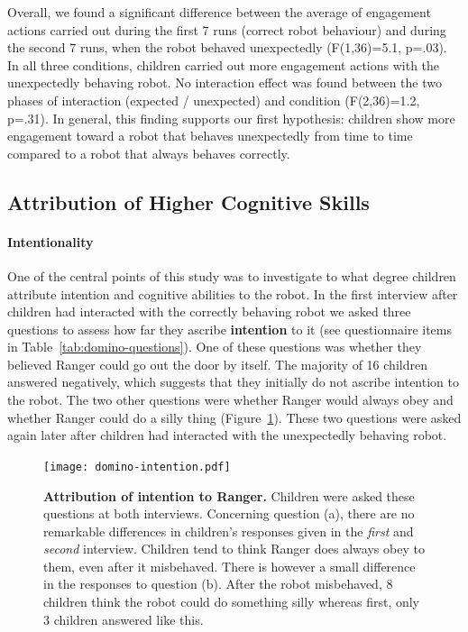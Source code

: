 \documentclass{sig-alternate}
\begin{document}
Overall, we found a significant difference between the average of engagement
actions carried out during the first 7 runs (correct robot behaviour) and during
the second 7 runs, when the robot behaved unexpectedly (F(1,36)=5.1, p=.03). In
all three conditions, children carried out more engagement actions with the
unexpectedly behaving robot. No interaction effect was found between the two
phases of interaction (expected / unexpected) and condition (F(2,36)=1.2,
p=.31). In general, this finding supports our first hypothesis: children show
more engagement toward a robot that behaves unexpectedly from time to time
compared to a robot that always behaves correctly.

\subsection{Attribution of Higher Cognitive Skills}

\paragraph{Intentionality}

One of the central points of this study was to investigate to what degree
children attribute intention and cognitive abilities to the robot.  In the first
interview after children had interacted with the correctly behaving robot we
asked three questions to assess how far they ascribe \textbf{intention} to it
(see questionnaire items in Table~\ref{tab:domino-questions}). One of these
questions was whether they believed Ranger could go out the door by itself. The
majority of 16 children answered negatively, which suggests that they initially
do not ascribe intention to the robot. The two other questions were whether
Ranger would always obey and whether Ranger could do a silly thing
(Figure~\ref{fig:domino-intention}). These two questions were asked again later
after children had interacted with the unexpectedly behaving robot.


\begin{figure}[h]
    \centering
    \texttt{[image: domino-intention.pdf]}
    \caption{\small \textbf{Attribution of intention to Ranger.} Children were
        asked these questions at both interviews. Concerning question (a), there
        are no remarkable differences in children's responses given in the
        \textit{first} and \textit{second} interview.  Children tend to think
        Ranger does always obey to them, even after it misbehaved. There is
        however a small difference in the responses to question (b).  After the
        robot misbehaved, 8 children think the robot could do something silly whereas
        first, only 3 children answered like this.}
    
    \label{fig:domino-intention}

\end{figure}
\end{document}
